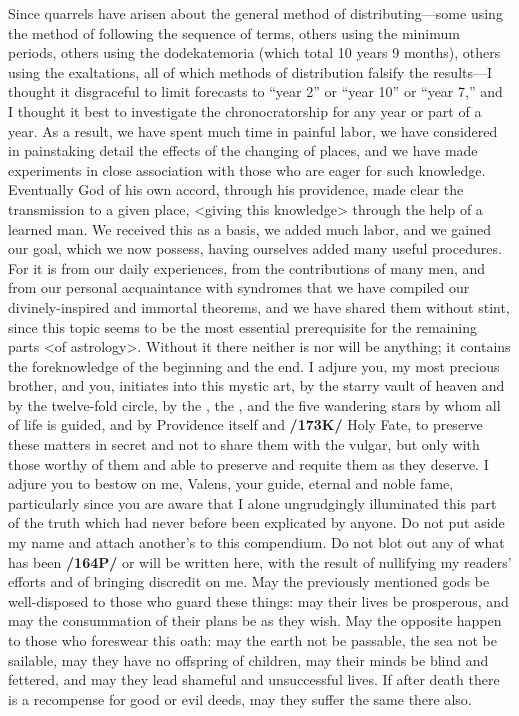 Since quarrels have arisen about the general method of distributing—some using the method of following the sequence of terms, others using the minimum periods, others using the dodekatemoria (which total 10 years 9 months), others using the exaltations, all of which methods of distribution falsify the results—I thought it disgraceful to limit forecasts to “year 2” or “year 10” or “year 7,” and I thought it best to investigate the chronocratorship for any year or part of a year. As a result, we have spent much time in painful labor, we have considered in painstaking detail the effects of the changing of places, and we have made experiments in close association with those who are eager for such knowledge. Eventually God of his own accord, through his providence, made clear the transmission to a given place, <giving this
knowledge> through the help of a learned man. We received this as a basis, we added much labor, and we gained our goal, which we now possess, having ourselves added many useful procedures. For it is from our daily experiences, from the contributions of many men, and from our personal acquaintance with syndromes that we have compiled our divinely-inspired and immortal theorems, and we have shared them without stint, since this topic seems to be the most essential prerequisite for the remaining parts <of astrology>. Without it there neither is nor will be anything; it contains the foreknowledge of the beginning and the end. I adjure you, my most precious brother, and you, initiates into this mystic art, by the starry vault of heaven and by the twelve-fold circle, by the \Sun, the \Moon, and the five wandering stars by whom all of life is guided, and by Providence itself and \textbf{/173K/} Holy Fate, to preserve these matters in secret and not to
share them with the vulgar, but only with those worthy of them and able to preserve and requite them as they deserve. I adjure you to bestow on me, Valens, your guide, eternal and noble fame, particularly since you are aware that I alone ungrudgingly illuminated this part of the truth which had never before been explicated by anyone. Do not put aside my name and attach another’s to this compendium. Do not blot
out any of what has been \textbf{/164P/} or will be written here, with the result of nullifying my readers’ efforts and
of bringing discredit on me. May the previously mentioned gods be well-disposed to those who guard these things: may their lives be prosperous, and may the consummation of their plans be as they wish. May the opposite happen to those who foreswear this oath: may the earth not be passable, the sea not be sailable, may they have no offspring of children, may their minds be blind and fettered, and may they lead shameful and unsuccessful lives. If after death there is a recompense for good or evil deeds, may they suffer the same there also.

